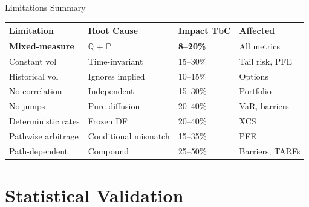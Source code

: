 \documentclass[11pt,aspectratio=169]{beamer}
\begin{document}
	\begin{frame}{Limitations Summary}
		\scriptsize
		\begin{table}
			\begin{tabular}{|p{3cm}|p{3cm}|p{2.5cm}|p{2.5cm}|}
				\hline
				\textbf{Limitation} & \textbf{Root Cause} & \textbf{Impact TbC} & \textbf{Affected} \\
				\hline
				\rowcolor{yellow!30}
				\textbf{Mixed-measure} & $\mathbb{Q}$ + $\mathbb{P}$ & \textbf{8--20\%} & All metrics \\
				\hline
				Constant vol & Time-invariant & 15--30\% & Tail risk, PFE \\
				\hline
				Historical vol & Ignores implied & 10--15\% & Options \\
				\hline
				No correlation & Independent & 15--30\% & Portfolio \\
				\hline
				No jumps & Pure diffusion & 20--40\% & VaR, barriers \\
				\hline
				Deterministic rates & Frozen DF & 20--40\% & XCS \\
				\hline
				Pathwise arbitrage & Conditional mismatch & 15--35\% & PFE \\
				\hline
				Path-dependent & Compound & 25--50\% & Barriers, TARFs \\
				\hline
			\end{tabular}
		\end{table}
		\normalsize
	\end{frame}
	
	\section{Statistical Validation}
	
\end{document}
